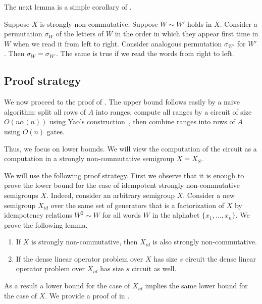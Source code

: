 \documentclass{toc}
\begin{document}
The next lemma is a simple corollary of .
\begin{lemma} \label{lem:variables_order}
Suppose $X$ is strongly non-commutative. Suppose $W \sim W'$ holds in $X$. Consider a permutation $\sigma_W$ of the letters of $W$ in the order in which they appear first time in $W$ when we read it from left to right. Consider analogous permutation $\sigma_{W'}$ for $W'$. Then $\sigma_W = \sigma_{W'}$.
%
The same is true if we read the words from right to left.

\end{lemma}

\subsection{Proof strategy}


We now proceed to the proof of . The upper bound
follows easily by a naive algorithm: split all rows of $A$ into ranges, compute
all ranges by a circuit of size $O(n\alpha(n))$ using Yao's
construction~\cite{DBLP:conf/stoc/Yao82}, then combine ranges into rows of $A$
using $O(n)$ gates.

Thus, we focus on lower bounds. We will view the computation of the circuit as a
computation in a strongly non-commutative semigroup $X=X_S$.

We will use the following proof strategy. First we observe that it is enough to
prove the lower bound for the case of idempotent strongly non-commutative
semigroups $X$. Indeed,
consider an arbitrary semigroup $X$. Consider a new semigroup $X_{id}$ over the same set of generators that is a factorization of $X$ by idempotency relations $W^2\sim W$ for all words $W$ in the alphabet $\{x_1,\ldots, x_n\}$.
We prove the following lemma.
\begin{lemma} \label{lem:idempotent_is_hardest}
	\begin{enumerate}
		\item If $X$ is strongly non-commutative, then $X_{id}$ is also strongly non-commutative.
		\item If the dense linear operator problem over $X$ has size $s$
		circuit the dense linear operator problem over $X_{id}$ has size
		$s$ circuit as well.
	\end{enumerate}
\end{lemma}
As a result a lower bound for the case of $X_{id}$ implies the same lower bound for the case of $X$.
We provide a proof of  in
.
\end{document}
